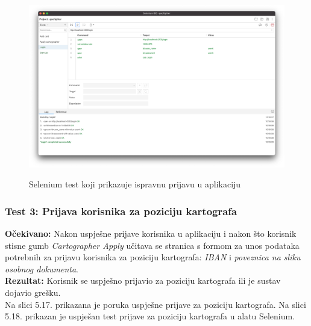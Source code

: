 			\begin{figure}[H]
				\centering
				\includegraphics[scale=0.27]{dokumentacija/slike/SeleniumLoginTest.png} \\
				\caption{ Selenium test koji prikazuje ispravnu prijavu u aplikaciju}
				\label{fig:SeleniumRegistrationFail}
			\end{figure}

			\subsubsection{Test 3: Prijava korisnika za poziciju kartografa}
			\textbf{Očekivano: } Nakon uspješne prijave korisnika u aplikaciju i nakon što korisnik stisne gumb \textit{Cartographer Apply} učitava se stranica s formom za unos podataka potrebnih za prijavu korisnika za poziciju kartografa: \textit{IBAN} i \textit{poveznica na sliku osobnog dokumenta}.\\
			\textbf{Rezultat: } Korisnik  se uspješno prijavio za poziciju kartografa ili  je  sustav  dojavio grešku.\\

			    Na slici 5.17. prikazana je poruka uspješne prijave za poziciju kartografa. Na slici 5.18. prikazan je uspješan test prijave za poziciju kartografa u alatu Selenium.

